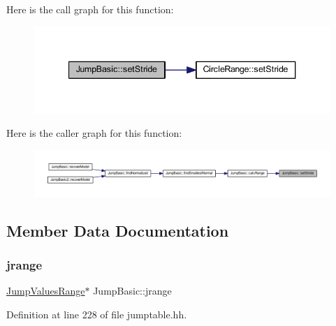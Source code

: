 Here is the call graph for this function\+:
\nopagebreak
\begin{figure}[H]
\begin{center}
\leavevmode
\includegraphics[width=340pt]{class_jump_basic_a3cc7f57027e323fef2d68388cf2c470c_cgraph}
\end{center}
\end{figure}
Here is the caller graph for this function\+:
\nopagebreak
\begin{figure}[H]
\begin{center}
\leavevmode
\includegraphics[width=350pt]{class_jump_basic_a3cc7f57027e323fef2d68388cf2c470c_icgraph}
\end{center}
\end{figure}


\subsection{Member Data Documentation}
\mbox{\label{class_jump_basic_a5a132a1f60bd90b67c7b1e7d8627656d}} 
\subsubsection{\texorpdfstring{jrange}{jrange}}
{\footnotesize\ttfamily \mbox{\hyperlink{class_jump_values_range}{Jump\+Values\+Range}}$\ast$ Jump\+Basic\+::jrange\hspace{0.3cm}{\ttfamily [protected]}}



Definition at line 228 of file jumptable.\+hh.

\mbox{\label{class_jump_basic_ab2aa4072b79d87215a6aeb27aa8d4464}} 
